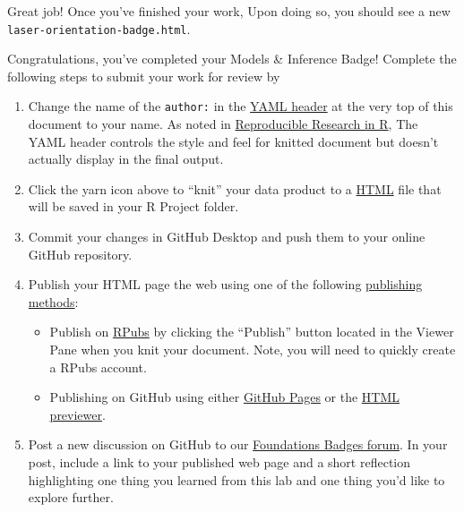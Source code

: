 \documentclass[
]{article}
\begin{document}
Great job! Once you've finished your work, Upon doing so, you should see
a new \texttt{laser-orientation-badge.html}.

Congratulations, you've completed your Models \& Inference Badge!
Complete the following steps to submit your work for review by

\begin{enumerate}
\def\labelenumi{\arabic{enumi}.}
\item
  Change the name of the \texttt{author:} in the
  \href{https://monashdatafluency.github.io/r-rep-res/yaml-header.html}{YAML
  header} at the very top of this document to your name. As noted in
  \href{https://monashdatafluency.github.io/r-rep-res/index.html}{Reproducible
  Research in R}, The YAML header controls the style and feel for
  knitted document but doesn't actually display in the final output.
\item
  Click the yarn icon above to ``knit'' your data product to a
  \href{https://bookdown.org/yihui/rmarkdown/html-document.html}{HTML}
  file that will be saved in your R Project folder.
\item
  Commit your changes in GitHub Desktop and push them to your online
  GitHub repository.
\item
  Publish your HTML page the web using one of the following
  \href{https://rpubs.com/cathydatascience/518692}{publishing methods}:

  \begin{itemize}
  \item
    Publish on \href{https://rpubs.com}{RPubs} by clicking the
    ``Publish'' button located in the Viewer Pane when you knit your
    document. Note, you will need to quickly create a RPubs account.
  \item
    Publishing on GitHub using either
    \href{https://pages.github.com}{GitHub Pages} or the
    \href{http://htmlpreview.github.io}{HTML previewer}.
  \end{itemize}
\item
  Post a new discussion on GitHub to our
  \href{https://github.com/orgs/laser-institute/teams/foundations/discussions/2}{Foundations
  Badges forum}. In your post, include a link to your published web page
  and a short reflection highlighting one thing you learned from this
  lab and one thing you'd like to explore further.
\end{enumerate}
\end{document}
